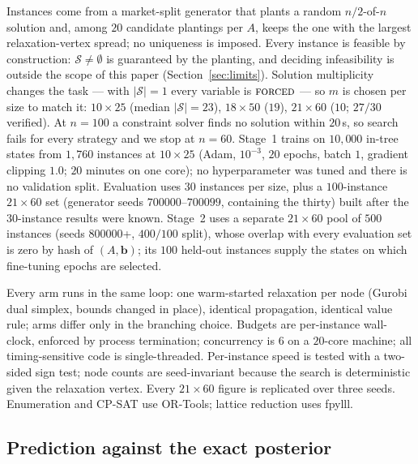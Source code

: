 \documentclass[final,5p,times,twocolumn]{elsarticle}
\newcommand{\SOL}{\mathcal{S}}
\newcommand{\FORCED}{\textsc{forced}}
\begin{document}
Instances come from a market-split generator that plants a random $n/2$-of-$n$ solution and, among $20$ candidate plantings per $A$, keeps the one with the largest relaxation-vertex spread; no uniqueness is imposed. Every instance is feasible by construction: $\SOL\neq\emptyset$ is guaranteed by the planting, and deciding infeasibility is outside the scope of this paper (Section~\ref{sec:limits}). Solution multiplicity changes the task --- with $|\SOL|=1$ every variable is $\FORCED$ --- so $m$ is chosen per size to match it: $10\times25$ (median $|\SOL|=23$), $18\times50$ ($19$), $21\times60$ ($10$; $27/30$ verified). At $n=100$ a constraint solver finds no solution within $20$\,s, so search fails for every strategy and we stop at $n=60$. Stage~1 trains on $10{,}000$ in-tree states from $1{,}760$ instances at $10\times25$ (Adam, $10^{-3}$, $20$ epochs, batch $1$, gradient clipping $1.0$; $20$ minutes on one core); no hyperparameter was tuned and there is no validation split. Evaluation uses $30$ instances per size, plus a $100$-instance $21\times60$ set (generator seeds $700000$--$700099$, containing the thirty) built after the $30$-instance results were known. Stage~2 uses a separate $21\times60$ pool of $500$ instances (seeds $800000$+, $400/100$ split), whose overlap with every evaluation set is zero by hash of $(A,\mathbf{b})$; its $100$ held-out instances supply the states on which fine-tuning epochs are selected.

Every arm runs in the same loop: one warm-started relaxation per node (Gurobi dual simplex, bounds changed in place), identical propagation, identical value rule; arms differ only in the branching choice. Budgets are per-instance wall-clock, enforced by process termination; concurrency is $6$ on a $20$-core machine; all timing-sensitive code is single-threaded. Per-instance speed is tested with a two-sided sign test; node counts are seed-invariant because the search is deterministic given the relaxation vertex. Every $21\times60$ figure is replicated over three seeds. Enumeration and CP-SAT use OR-Tools; lattice reduction uses fpylll.

\subsection{Prediction against the exact posterior}
\label{sec:exp-pred}
\end{document}
